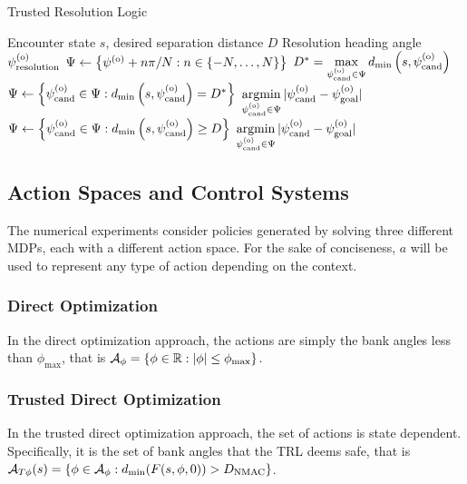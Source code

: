 \renewcommand{\algorithmicrequire}{\textbf{Input:}}
\renewcommand{\algorithmicensure}{\textbf{Output:}}
\begin{algorithm}[tbhp]
    \caption{Trusted Resolution Logic}\label{alg:trl}
\begin{algorithmic}
    \Require Encounter state $s$, desired separation distance $D$
    \Ensure Resolution heading angle $\psi^{(\mathrm{o})}_\mathrm{resolution}$
        \State $\Psi \gets \left\{\psi^{(\mathrm{o})} + n\pi/N : n \in \{-N,\ldots,N\} \right\}$
        \State $D^* = \underset{\psi^{(\mathrm{o})}_{\mathrm{cand}} \in \Psi}{\max}\, d_\text{min}\left(s, \psi^{(\mathrm{o})}_{\mathrm{cand}}\right)$
         
            \State $\Psi \gets \left\{\psi^{(\mathrm{o})}_{\mathrm{cand}} \in \Psi : d_\text{min}\left(s, \psi^{(\mathrm{o})}_{\mathrm{cand}}\right) = D^*\right\}$
            \State \Return $\underset{\psicand \in \Psi}{\argmin}\,|\psicand-\psigoal|$
        \Else
            \State $\Psi \gets \left\{\psi^{(\mathrm{o})}_{\mathrm{cand}} \in \Psi : d_\text{min}\left(s, \psi^{(\mathrm{o})}_{\mathrm{cand}}\right) \geq D\right\}$
            \State \Return $\underset{\psicand \in \Psi}{\argmin}\,|\psicand-\psigoal|$
        \EndIf
    \EndFunction
\end{algorithmic}
\end{algorithm}


\subsection{Action Spaces and Control Systems}\label{sec:aspaces}

The numerical experiments consider policies generated by solving three different MDPs, each with a different action space. 
For the sake of conciseness, $a$ will be used to represent any type of action depending on the context.

\subsubsection{Direct Optimization}

In the direct optimization approach, the actions are simply the bank angles less than $\phi_\text{max}$, that is ${\mathcal{A}}_\phi = \left\{\phi \in \mathbb{R}: |\phi| \leq \phi_\text{max} \right\}$.

\subsubsection{Trusted Direct Optimization}

In the trusted direct optimization approach, the set of actions is state dependent.
Specifically, it is the set of bank angles that the TRL deems safe, that is ${\mathcal{A}}_{T\phi}(s) = \left\{\phi \in {\ensuremath{\mathcal{A}}}_\phi: d_\text{min}(F(s, \phi, 0)) > D_\text{NMAC} \right\}$.


